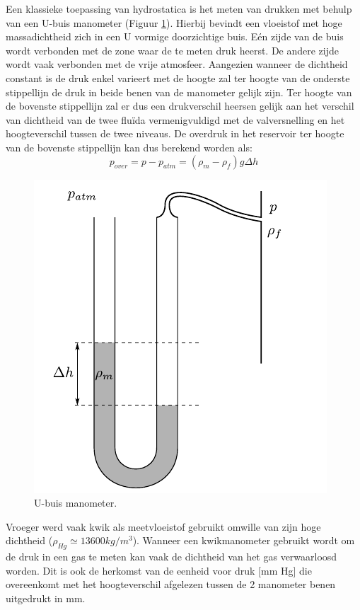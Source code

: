 Een klassieke toepassing van hydrostatica is het meten van drukken met behulp van een U-buis manometer (Figuur \ref{fig:Ubuis_manometer}). Hierbij bevindt een vloeistof met hoge massadichtheid zich in een U vormige doorzichtige buis. E\'en zijde van de buis wordt verbonden met de zone waar de te meten druk heerst. De andere zijde wordt vaak verbonden met de vrije atmosfeer. Aangezien wanneer de dichtheid constant is de druk enkel varieert met de hoogte zal ter hoogte van de onderste stippellijn de druk in beide benen van de manometer gelijk zijn. Ter hoogte van de bovenste stippellijn zal er dus een drukverschil heersen gelijk aan het verschil van dichtheid van de twee fluïda vermenigvuldigd met de valversnelling en het hoogteverschil tussen de twee niveaus. De overdruk in het reservoir ter hoogte van de bovenste stippellijn kan dus berekend worden als: 
\begin{equation}
	p_{over} = p-p_{atm} = (\rho_m-\rho_f) g \Delta h
\end{equation}
\begin{figure}[htb]
	\centering
	\includegraphics{fig/hydrostatica/u-buis_manometer}
	\caption{U-buis manometer.}
	\label{fig:Ubuis_manometer}
\end{figure}
Vroeger werd vaak kwik als meetvloeistof gebruikt omwille van zijn hoge dichtheid ($\rho_{Hg} \simeq 13600\unit{kg/m^3}$). Wanneer een kwikmanometer gebruikt wordt om de druk in een gas te meten kan vaak de dichtheid van het gas verwaarloosd worden. Dit is ook de herkomst van de eenheid voor druk [mm Hg] die overeenkomt met het hoogteverschil afgelezen tussen de 2 manometer benen uitgedrukt in mm.

